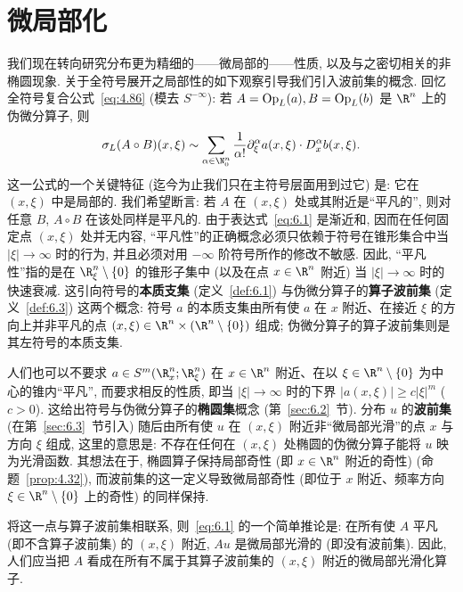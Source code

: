 

\chapter{微局部化}\label{ch:06}
%

我们现在转向研究分布更为精细的——微局部的——性质, 以及与之密切相关的非椭圆现象. 关于全符号展开之局部性的如下观察引导我们引入波前集的概念. 回忆全符号复合公式~\eqref{eq:4.86} (模去 $S^{-\infty}$): 若 $A = \operatorname{Op}_L(a), B = \operatorname{Op}_L(b)$ 是 $\R^n$ 上的伪微分算子, 则
\begin{equation}\label{eq:6.1}
    \sigma_L(A \circ B)(x, \xi) \sim \sum_{\alpha \in \N_0^n} \frac{1}{\alpha!} \partial_\xi^\alpha a(x, \xi) \cdot D_x^\alpha b(x, \xi).
\end{equation}
这一公式的一个关键特征 (迄今为止我们只在主符号层面用到过它) 是: 它在 $(x, \xi)$ 中是局部的. 我们希望断言: 若 $A$ 在 $(x, \xi)$ 处或其附近是``平凡的'', 则对任意 $B$, $A \circ B$ 在该处同样是平凡的. 由于表达式~\eqref{eq:6.1} 是渐近和, 因而在任何固定点 $(x, \xi)$ 处并无内容, ``平凡性''的正确概念必须只依赖于符号在锥形集合中当 $|\xi| \to \infty$ 时的行为, 并且必须对用 $-\infty$ 阶符号所作的修改不敏感. 因此, ``平凡性''指的是在 $\R^n_\xi \setminus \{0\}$ 的锥形子集中 (以及在点 $x \in \R^n$ 附近) 当 $|\xi| \to \infty$ 时的快速衰减. 这引向符号的\textbf{本质支集} (定义~\ref{def:6.1}) 与伪微分算子的\textbf{算子波前集} (定义~\ref{def:6.3}) 这两个概念: 符号 $a$ 的本质支集由所有使 $a$ 在 $x$ 附近、在接近 $\xi$ 的方向上并非平凡的点 $(x, \xi) \in \R^n \times (\R^n \setminus \{0\})$ 组成; 伪微分算子的算子波前集则是其左符号的本质支集.

人们也可以不要求 $a \in S^m(\R^n_x; \R^n_\xi)$ 在 $x \in \R^n$ 附近、在以 $\xi \in \R^n \setminus \{0\}$ 为中心的锥内``平凡'', 而要求相反的性质, 即当 $|\xi| \to \infty$ 时的下界 $|a(x, \xi)| \ge c |\xi|^m$ ($c > 0$). 这给出符号与伪微分算子的\textbf{椭圆集}概念 (第~\ref{sec:6.2}~节). 分布 $u$ 的\textbf{波前集} (在第~\ref{sec:6.3}~节引入) 随后由所有使 $u$ 在 $(x, \xi)$ 附近非``微局部光滑''的点 $x$ 与方向 $\xi$ 组成, 这里的意思是: 不存在任何在 $(x, \xi)$ 处椭圆的伪微分算子能将 $u$ 映为光滑函数. 其想法在于, 椭圆算子保持局部奇性 (即 $x \in \R^n$ 附近的奇性) (命题~\ref{prop:4.32}), 而波前集的这一定义导致微局部奇性 (即位于 $x$ 附近、频率方向 $\xi \in \R^n \setminus \{0\}$ 上的奇性) 的同样保持.

将这一点与算子波前集相联系, 则~\eqref{eq:6.1} 的一个简单推论是: 在所有使 $A$ 平凡 (即不含算子波前集) 的 $(x, \xi)$ 附近, $A u$ 是微局部光滑的 (即没有波前集). 因此, 人们应当把 $A$ 看成在所有不属于其算子波前集的 $(x, \xi)$ 附近的微局部光滑化算子.


